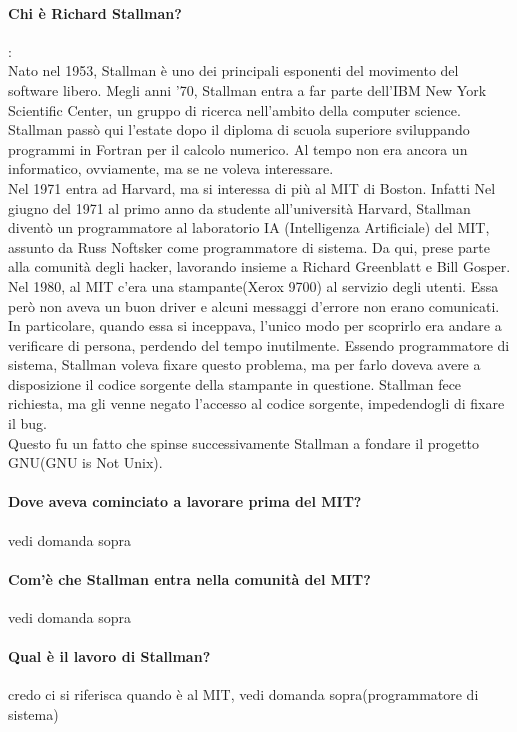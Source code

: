 \documentclass[a4paper]{article}
\begin{document}
		\paragraph{Chi è Richard Stallman?}: \\
		Nato nel 1953, Stallman è uno dei principali esponenti del movimento del software libero.
		Megli anni '70, Stallman entra a far parte dell'IBM New York Scientific Center, un gruppo di ricerca nell'ambito della computer science. Stallman passò qui l'estate dopo il diploma di scuola superiore sviluppando programmi in Fortran per il calcolo numerico. Al tempo non era ancora un informatico, ovviamente, ma se ne voleva interessare.\\
		Nel 1971 entra ad Harvard, ma si interessa di più al MIT di Boston. Infatti Nel giugno del 1971 al primo anno da studente all'università Harvard, Stallman diventò un programmatore al laboratorio IA (Intelligenza Artificiale) del MIT, assunto da Russ Noftsker come programmatore di sistema. Da qui, prese parte alla comunità degli hacker, lavorando insieme a Richard Greenblatt e Bill Gosper. \\
		Nel 1980, al MIT c'era una stampante(Xerox 9700) al servizio degli utenti. Essa però non aveva un buon driver e alcuni messaggi d'errore non erano comunicati. In particolare, quando essa si inceppava, l'unico modo per scoprirlo era andare a verificare di persona, perdendo del tempo inutilmente. Essendo programmatore di sistema, Stallman voleva fixare questo problema, ma per farlo doveva avere a disposizione il codice sorgente della stampante in questione. Stallman fece richiesta, ma gli venne negato l'accesso al codice sorgente, impedendogli di fixare il bug.\\
		Questo fu un fatto che spinse successivamente Stallman a fondare il progetto GNU(GNU is Not Unix).
		
		\paragraph{Dove aveva cominciato a lavorare prima del MIT?}
		vedi domanda sopra
		\paragraph{Com'è che Stallman entra nella comunità del MIT?}
		vedi domanda sopra
		\paragraph{Qual è il lavoro di Stallman?}
		credo ci si riferisca quando è al MIT, vedi domanda sopra(programmatore di sistema)
\end{document}
